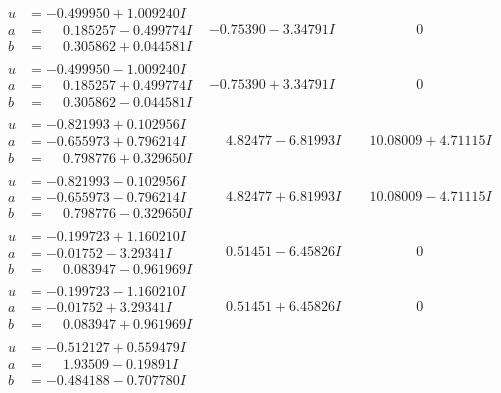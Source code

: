 \documentclass[1p]{elsarticle_modified}
\theoremstyle{definition}
\begin{document}
$$\begin{array}{c|c|c}
\begin{aligned}
u &= -0.499950 + 1.009240 I \\
a &= \phantom{-}0.185257 - 0.499774 I \\
b &= \phantom{-}0.305862 + 0.044581 I\end{aligned}
 & -0.75390 - 3.34791 I & \phantom{-0.000000 } 0 \\ \hline\begin{aligned}
u &= -0.499950 - 1.009240 I \\
a &= \phantom{-}0.185257 + 0.499774 I \\
b &= \phantom{-}0.305862 - 0.044581 I\end{aligned}
 & -0.75390 + 3.34791 I & \phantom{-0.000000 } 0 \\ \hline\begin{aligned}
u &= -0.821993 + 0.102956 I \\
a &= -0.655973 + 0.796214 I \\
b &= \phantom{-}0.798776 + 0.329650 I\end{aligned}
 & \phantom{-}4.82477 - 6.81993 I & \phantom{-}10.08009 + 4.71115 I \\ \hline\begin{aligned}
u &= -0.821993 - 0.102956 I \\
a &= -0.655973 - 0.796214 I \\
b &= \phantom{-}0.798776 - 0.329650 I\end{aligned}
 & \phantom{-}4.82477 + 6.81993 I & \phantom{-}10.08009 - 4.71115 I \\ \hline\begin{aligned}
u &= -0.199723 + 1.160210 I \\
a &= -0.01752 - 3.29341 I \\
b &= \phantom{-}0.083947 - 0.961969 I\end{aligned}
 & \phantom{-}0.51451 - 6.45826 I & \phantom{-0.000000 } 0 \\ \hline\begin{aligned}
u &= -0.199723 - 1.160210 I \\
a &= -0.01752 + 3.29341 I \\
b &= \phantom{-}0.083947 + 0.961969 I\end{aligned}
 & \phantom{-}0.51451 + 6.45826 I & \phantom{-0.000000 } 0 \\ \hline\begin{aligned}
u &= -0.512127 + 0.559479 I \\
a &= \phantom{-}1.93509 - 0.19891 I \\
b &= -0.484188 - 0.707780 I\end{aligned}

\end{array}$$
\end{document}
